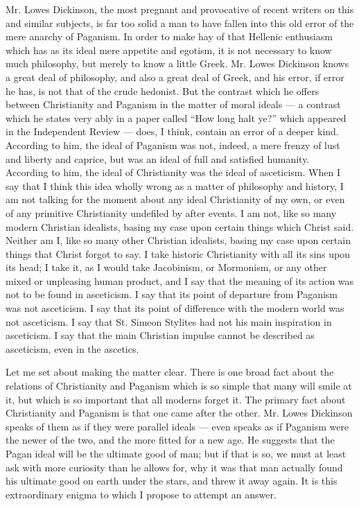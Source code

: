 Mr. Lowes Dickinson, the most pregnant and provocative of recent writers on this and similar subjects, is far too solid a man to have fallen into this old error of the mere anarchy of Paganism. In order to make hay of that Hellenic enthusiasm which has as its ideal mere appetite and egotism, it is not necessary to know much philosophy, but merely to know a little Greek. Mr. Lowes Dickinson knows a great deal of philosophy, and also a great deal of Greek, and his error, if error he has, is not that of the crude hedonist. But the contrast which he offers between Christianity and Paganism in the matter of moral ideals — a contrast which he states very ably in a paper called “How long halt ye?” which appeared in the Independent Review — does, I think, contain an error of a deeper kind. According to him, the ideal of Paganism was not, indeed, a mere frenzy of lust and liberty and caprice, but was an ideal of full and satisfied humanity. According to him, the ideal of Christianity was the ideal of asceticism. When I say that I think this idea wholly wrong as a matter of philosophy and history, I am not talking for the moment about any ideal Christianity of my own, or even of any primitive Christianity undefiled by after events. I am not, like so many modern Christian idealists, basing my case upon certain things which Christ said. Neither am I, like so many other Christian idealists, basing my case upon certain things that Christ forgot to say. I take historic Christianity with all its sins upon its head; I take it, as I would take Jacobinism, or Mormonism, or any other mixed or unpleasing human product, and I say that the meaning of its action was not to be found in asceticism. I say that its point of departure from Paganism was not asceticism. I say that its point of difference with the modern world was not asceticism. I say that St. Simeon Stylites had not his main inspiration in asceticism. I say that the main Christian impulse cannot be described as asceticism, even in the ascetics.

Let me set about making the matter clear. There is one broad fact about the relations of Christianity and Paganism which is so simple that many will smile at it, but which is so important that all moderns forget it. The primary fact about Christianity and Paganism is that one came after the other. Mr. Lowes Dickinson speaks of them as if they were parallel ideals — even speaks as if Paganism were the newer of the two, and the more fitted for a new age. He suggests that the Pagan ideal will be the ultimate good of man; but if that is so, we must at least ask with more curiosity than he allows for, why it was that man actually found his ultimate good on earth under the stars, and threw it away again. It is this extraordinary enigma to which I propose to attempt an answer.

